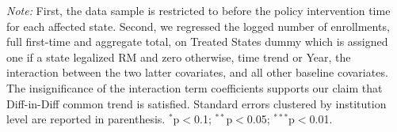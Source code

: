 \documentclass[12pt]{article}%
\begin{document}
\textit{Note:} First, the data sample is restricted to before the policy intervention time for each affected state. Second, we regressed the logged number of enrollments, full first-time and aggregate total, on  Treated States dummy which is assigned one if a state legalized RM and zero otherwise, time trend or Year, the interaction between the two latter covariates, and all other baseline covariates. The insignificance of the interaction term coefficients supports our claim that Diff-in-Diff common trend is satisfied. Standard errors clustered by institution level are reported in parenthesis. $^{*}$p$<$0.1; $^{**}$p$<$0.05; $^{***}$p$<$0.01.
\end{document}
